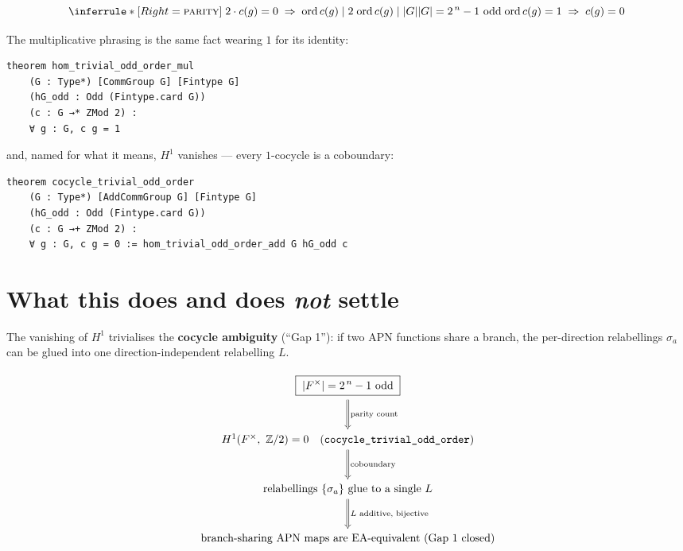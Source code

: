 \documentclass[11pt]{article}
\begin{document}
\[
\inferrule*[Right=\textsc{parity}]
{
  \;2\cdot c(g)=0\;\Rightarrow\;\mathrm{ord}\,c(g)\mid 2\;
  \\
  \;\mathrm{ord}\,c(g)\mid |G|\;
  \\
  |G|=2^{\,n}-1\ \text{odd}
}
{\;\mathrm{ord}\,c(g)=1\;\Rightarrow\;c(g)=0\;}
\]

\noindent
The multiplicative phrasing is the same fact wearing $1$ for its identity:

\begin{lstlisting}
theorem hom_trivial_odd_order_mul
    (G : Type*) [CommGroup G] [Fintype G]
    (hG_odd : Odd (Fintype.card G))
    (c : G →* ZMod 2) :
    ∀ g : G, c g = 1
\end{lstlisting}

\noindent
and, named for what it means, $H^1$ vanishes --- every $1$-cocycle is a
coboundary:

\begin{lstlisting}
theorem cocycle_trivial_odd_order
    (G : Type*) [AddCommGroup G] [Fintype G]
    (hG_odd : Odd (Fintype.card G))
    (c : G →+ ZMod 2) :
    ∀ g : G, c g = 0 := hom_trivial_odd_order_add G hG_odd c
\end{lstlisting}


\bigskip

\section{What this does and does \emph{not} settle}

\noindent
The vanishing of $H^1$ trivialises the \textbf{cocycle ambiguity} (``Gap 1''):
if two APN functions share a branch, the per-direction relabellings $\sigma_a$
can be glued into one direction-independent relabelling $L$.

\[
\begin{tikzcd}[row sep=large, column sep=huge]
\boxed{\;|F^\times|=2^{\,n}-1\ \text{odd}\;}
  \arrow[d, Rightarrow, "{\text{parity count}}"] \\
H^1(F^\times,\ \mathbb{Z}/2)=0 \quad(\texttt{cocycle\_trivial\_odd\_order})
  \arrow[d, Rightarrow, "{\text{coboundary}}"] \\
\text{relabellings } \{\sigma_a\} \text{ glue to a single } L
  \arrow[d, Rightarrow, "{L\text{ additive, bijective}}"] \\
\text{branch-sharing APN maps are EA-equivalent (Gap 1 closed)}
\end{tikzcd}
\]
\end{document}
